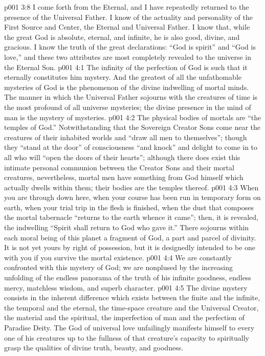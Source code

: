 \vs p001 3:8 I come forth from the Eternal, and I have repeatedly returned to the presence of the Universal Father. I know of the actuality and personality of the First Source and Center, the Eternal and Universal Father. I know that, while the great God is absolute, eternal, and infinite, he is also good, divine, and gracious. I know the truth of the great declarations: “God is spirit” and “God is love,” and these two attributes are most completely revealed to the universe in the Eternal Son.
\vs p001 4:1 The infinity of the perfection of God is such that it eternally constitutes him mystery. And the greatest of all the unfathomable mysteries of God is the phenomenon of the divine indwelling of mortal minds. The manner in which the Universal Father sojourns with the creatures of time is the most profound of all universe mysteries; the divine presence in the mind of man is the mystery of mysteries.
\vs p001 4:2 The physical bodies of mortals are “the temples of God.” Notwithstanding that the Sovereign Creator Sons come near the creatures of their inhabited worlds and “draw all men to themselves”; though they “stand at the door” of consciousness “and knock” and delight to come in to all who will “open the doors of their hearts”; although there does exist this intimate personal communion between the Creator Sons and their mortal creatures, nevertheless, mortal men have something from God himself which actually dwells within them; their bodies are the temples thereof.
\vs p001 4:3 When you are through down here, when your course has been run in temporary form on earth, when your trial trip in the flesh is finished, when the dust that composes the mortal tabernacle “returns to the earth whence it came”; then, it is revealed, the indwelling “Spirit shall return to God who gave it.” There sojourns within each moral being of this planet a fragment of God, a part and parcel of divinity. It is not yet yours by right of possession, but it is designedly intended to be one with you if you survive the mortal existence.
\pc \vs p001 4:4 We are constantly confronted with this mystery of God; we are nonplused by the increasing unfolding of the endless panorama of the truth of his infinite goodness, endless mercy, matchless wisdom, and superb character.
\pc \vs p001 4:5 The divine mystery consists in the inherent difference which exists between the finite and the infinite, the temporal and the eternal, the time\hyp{}space creature and the Universal Creator, the material and the spiritual, the imperfection of man and the perfection of Paradise Deity. The God of universal love unfailingly manifests himself to every one of his creatures up to the fullness of that creature’s capacity to spiritually grasp the qualities of divine truth, beauty, and goodness.
